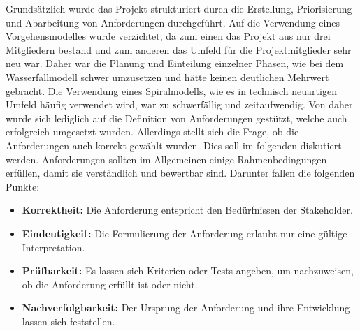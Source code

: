 \documentclass[12pt, a4paper]{report}
\begin{document}
Grundsätzlich wurde das Projekt strukturiert durch die Erstellung, Priorisierung und Abarbeitung von Anforderungen durchgeführt. Auf die Verwendung eines Vorgehensmodelles wurde verzichtet, da zum einen das Projekt aus nur drei Mitgliedern bestand und zum anderen das Umfeld für die Projektmitglieder sehr neu war. Daher war die Planung und Einteilung einzelner Phasen, wie bei dem Wasserfallmodell schwer umzusetzen und hätte keinen deutlichen Mehrwert gebracht. Die Verwendung eines Spiralmodells, wie es in technisch neuartigen Umfeld häufig verwendet wird, war zu schwerfällig und zeitaufwendig. Von daher wurde sich lediglich auf die Definition von Anforderungen gestützt, welche auch erfolgreich umgesetzt wurden. Allerdings stellt sich die Frage, ob die Anforderungen auch korrekt gewählt wurden. Dies soll im folgenden diskutiert werden.
\newline
Anforderungen sollten im Allgemeinen einige Rahmenbedingungen erfüllen, damit sie verständlich und bewertbar sind. Darunter fallen die folgenden Punkte:
\begin{itemize}
\item \textbf{Korrektheit:} Die Anforderung entspricht den Bedürfnissen der Stakeholder.
\item \textbf{Eindeutigkeit:} Die Formulierung der Anforderung erlaubt nur eine gültige Interpretation.
\item \textbf{Prüfbarkeit:} Es lassen sich Kriterien oder Tests angeben, um nachzuweisen, ob die Anforderung erfüllt ist oder nicht.
\item \textbf{Nachverfolgbarkeit:} Der Ursprung der Anforderung und ihre Entwicklung lassen sich feststellen.
\end{itemize}
\end{document}

